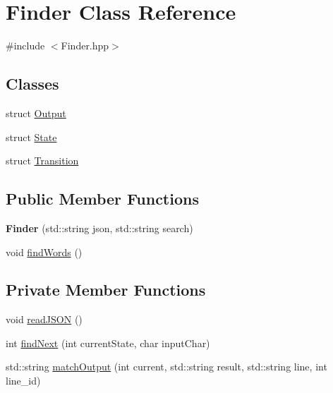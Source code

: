 \hypertarget{classFinder}{}\section{Finder Class Reference}
\label{classFinder}


{\ttfamily \#include $<$Finder.\+hpp$>$}

\subsection*{Classes}
\begin{DoxyCompactItemize}
\item 
struct \hyperlink{structFinder_1_1Output}{Output}
\item 
struct \hyperlink{structFinder_1_1State}{State}
\item 
struct \hyperlink{structFinder_1_1Transition}{Transition}
\end{DoxyCompactItemize}
\subsection*{Public Member Functions}
\begin{DoxyCompactItemize}
\item 
\mbox{\label{classFinder_ad20ecc3cbd3536c698d36ab64d2324d7}} 
{\bfseries Finder} (std\+::string json, std\+::string search)
\item 
void \hyperlink{classFinder_a5d406ff13d529df6d714e35effd0772f}{find\+Words} ()
\end{DoxyCompactItemize}
\subsection*{Private Member Functions}
\begin{DoxyCompactItemize}
\item 
void \hyperlink{classFinder_a21b8b64fb105f001ddb72a019389a764}{read\+J\+S\+ON} ()
\item 
int \hyperlink{classFinder_acf713e3cb4233451f239bcd4631caf44}{find\+Next} (int current\+State, char input\+Char)
\item 
std\+::string \hyperlink{classFinder_a1e517320c9df087be10d680f50d89a69}{match\+Output} (int current, std\+::string result, std\+::string line, int line\+\_\+id)
\end{DoxyCompactItemize}
